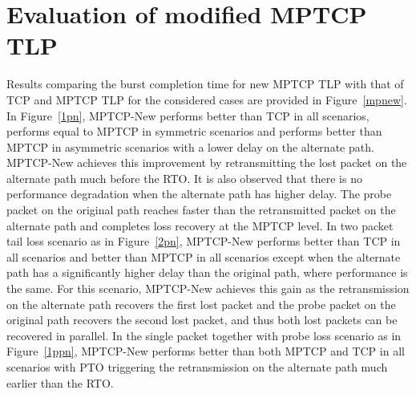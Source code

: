 \documentclass[10pt,conference]{IEEEtran}
\begin{document}
\section{Evaluation of modified MPTCP TLP}\label{eval}

Results comparing the burst completion time for new MPTCP TLP with that of TCP and MPTCP TLP for the considered cases are provided in 
Figure~\ref{mpnew}. In Figure~\ref{1pn}, MPTCP-New performs better than TCP in all scenarios, performs equal to MPTCP in symmetric scenarios and 
performs better than MPTCP in asymmetric scenarios with a lower delay on the alternate path. MPTCP-New achieves this improvement by retransmitting
 the lost packet on the alternate path much before the RTO. It is also observed that there is no performance degradation when the alternate path has 
 higher delay. The probe packet on the original path reaches faster than the retransmitted packet on the alternate path and completes loss recovery at the MPTCP level. In two packet 
 tail loss scenario as in Figure~\ref{2pn}, MPTCP-New performs better than TCP in all scenarios and better than MPTCP in all scenarios except when 
 the alternate path has a significantly higher delay than the original path, where performance is the same. For this scenario, MPTCP-New achieves
 this gain as the retransmission on the alternate path recovers the first lost packet and the probe packet on the original path recovers the
 second lost packet, and thus both lost packets can be recovered in parallel. 
 In the single packet together with probe 
 loss scenario as in Figure~\ref{1ppn}, MPTCP-New performs better than both MPTCP and TCP in all scenarios with PTO triggering the retransmission
 on the alternate path much earlier than the RTO. 


\end{document}
